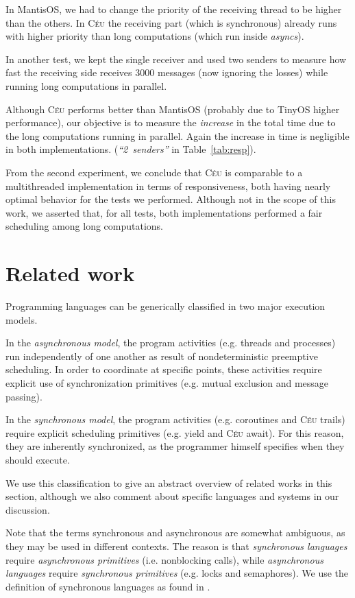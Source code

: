 \documentclass{sigplan-proc}
\newcommand{\2}{\;\;}
\newcommand{\5}{\;\;\;\;\;}
\newcommand{\CEU}{\textsc{C\'{e}u}}
\begin{document}
In MantisOS, we had to change the priority of the receiving thread to be higher 
than the others.
In \CEU{} the receiving part (which is synchronous) already runs with higher 
priority than long computations (which run inside \emph{asyncs}).

In another test, we kept the single receiver and used two senders to measure 
how fast the receiving side receives $3000$ messages (now ignoring the losses) 
while running long computations in parallel.

Although \CEU{} performs better than MantisOS (probably due to TinyOS higher 
performance), our objective is to measure the \emph{increase} in the total time 
due to the long computations running in parallel.
Again the increase in time is negligible in both implementations.
(\emph{``2~senders''} in Table~\ref{tab:resp}).

From the second experiment, we conclude that \CEU{} is comparable to a 
multithreaded implementation in terms of responsiveness, both having nearly 
optimal behavior for the tests we performed.
Although not in the scope of this work, we asserted that, for all tests, both 
implementations performed a fair scheduling among long computations.

\section{Related work}
\label{sec:related}

Programming languages can be generically classified in two major execution 
models.

In the \emph{asynchronous model}, the program activities (e.g. threads and 
processes) run independently of one another as result of nondeterministic 
preemptive scheduling.
In order to coordinate at specific points, these activities require explicit 
use of synchronization primitives (e.g. mutual exclusion and message passing).

In the \emph{synchronous model}, the program activities (e.g. coroutines and 
\CEU{} trails) require explicit scheduling primitives (e.g. yield and \CEU{} 
await).
For this reason, they are inherently synchronized, as the programmer himself 
specifies when they should execute.

We use this classification to give an abstract overview of related works in 
this section, although we also comment about specific languages and systems in 
our discussion.

Note that the terms synchronous and asynchronous are somewhat ambiguous, as 
they may be used in different contexts.
The reason is that \emph{synchronous languages} require \emph{asynchronous 
primitives} (i.e. nonblocking calls), while \emph{asynchronous languages} 
require \emph{synchronous primitives} (e.g. locks and semaphores).
We use the definition of synchronous languages as found in 
\cite{rp.twelve,rp.hypothesis}.
\end{document}
